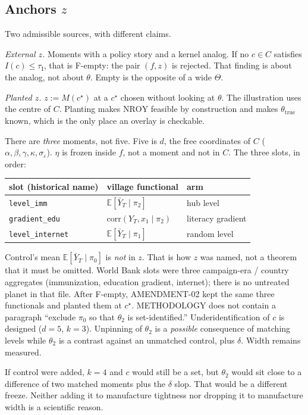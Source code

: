 \documentclass[11pt]{article}
\newcommand{\NROY}{\mathrm{NROY}}
\newcommand{\thr}{\tau_{\mathrm{I}}}
\begin{document}
\subsection{Anchors $z$}
\label{sec:zcontrol}
Two admissible sources, with different claims.

\emph{External $z$.} Moments with a policy story and a kernel analog.
If no $c\in C$ satisfies $I(c)\le\thr$, that is F-empty: the pair
$(f,z)$ is rejected. That finding is about the analog, not about
$\theta$. Empty is the opposite of a wide $\Theta$.

\emph{Planted $z$.} $z:=\widehat M(c^\star)$ at a $c^\star$ chosen
without looking at $\theta$. The illustration uses the centre of $C$.
Planting makes $\NROY$ feasible by construction and makes
$\theta_{\mathrm{true}}$ known, which is the only place an overlay is
checkable.

There are \emph{three} moments, not five. Five is $d$, the free
coordinates of $C$ ($\alpha,\beta,\gamma,\kappa,\sigma_\varepsilon$).
$\eta$ is frozen inside $f$, not a moment and not in $C$. The three
slots, in order:
\begin{center}
\small
\begin{tabular}{@{}lll@{}}
\toprule
slot (historical name) & village functional & arm \\
\midrule
\texttt{level\_imm} & $\mathbb{E}[\bar Y_T\mid\pi_2]$ & hub level \\
\texttt{gradient\_edu} & $\mathrm{corr}(Y_T,x_1\mid\pi_2)$ & literacy gradient \\
\texttt{level\_internet} & $\mathbb{E}[\bar Y_T\mid\pi_1]$ & random level \\
\bottomrule
\end{tabular}
\end{center}
Control's mean $\mathbb{E}[\bar Y_T\mid\pi_0]$ is \emph{not} in $z$.
That is how $z$ was named, not a theorem that it must be omitted.
World Bank slots were three campaign-era / country aggregates
(immunization, education gradient, internet); there is no untreated
planet in that file. After F-empty, AMENDMENT-02 kept the same three
functionals and planted them at $c^\star$. METHODOLOGY does not contain
a paragraph ``exclude $\pi_0$ so that $\theta_2$ is set-identified.''
Underidentification of $c$ is designed ($d=5$, $k=3$). Unpinning of
$\theta_2$ is a \emph{possible} consequence of matching levels while
$\theta_2$ is a contrast against an unmatched control, plus $\delta$.
Width remains measured.

If control were added, $k=4$ and $c$ would still be a set, but
$\theta_2$ would sit close to a difference of two matched moments plus
the $\delta$ slop. That would be a different freeze. Neither adding it
to manufacture tightness nor dropping it to manufacture width is a
scientific reason.
\end{document}
